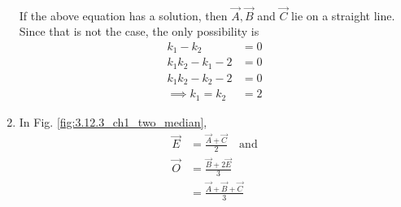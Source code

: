 \begin{enumerate}[label=\thesection.\arabic*.,ref=\thesection.\theenumi]
\begin{align}
\end{align}
%
If the above equation has a solution, then $\vec{A}, \vec{B}$ and $\vec{C}$ lie on a straight line.  Since that is not the case, the only possibility is 
\begin{align}
k_1-k_2 &= 0
\\
k_1k_2 -k_1 -2 &= 0
\\
k_1k_2 -k_2 -2 &= 0
\\
\implies k_1=k_2&=2
\end{align}
\item In Fig. \ref{fig:3.12.3_ch1_two_median},
\begin{align}
\vec{E} &=  \frac{\vec{A}+\vec{C}}{2} \quad \text{and}
\\
\vec{O}&= \frac{\vec{B}+2\vec{E}}{3}
\\
&= \frac{\vec{A}+\vec{B}+\vec{C}}{3}
\end{align}
\end{enumerate}
	

